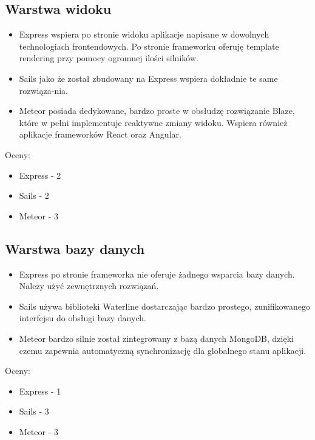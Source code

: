 \documentclass[12pt]{report}
\begin{document}
    \subsection{Warstwa widoku}
      \begin{itemize}
        \item Express wspiera po stronie widoku aplikacje napisane w dowolnych technologiach frontendowych. Po stronie frameworku oferuję template rendering przy pomocy ogromnej ilości silników.
        \item Sails jako że został zbudowany na Express wspiera dokładnie te same rozwiąza-nia.
        \item Meteor posiada dedykowane, bardzo proste w obsłudzę rozwiązanie Blaze, które w pełni implementuje reaktywne zmiany widoku. Wspiera również aplikacje frameworków React oraz Angular.
      \end{itemize}
      Oceny:
      \begin{itemize}
        \item Express - 2
        \item Sails - 2
        \item Meteor - 3
      \end{itemize}
      
    \subsection{Warstwa bazy danych}
      \begin{itemize}
        \item Express po stronie frameworka nie oferuje żadnego wsparcia bazy danych. Należy użyć zewnętrznych rozwiązań.
        \item Sails używa biblioteki Waterline dostarczając bardzo prostego, zunifikowanego interfejsu do obsługi bazy danych.
        \item Meteor bardzo silnie został zintegrowany z bazą danych MongoDB, dzięki czemu zapewnia automatyczną synchronizację dla globalnego stanu aplikacji.
      \end{itemize}
      Oceny:
      \begin{itemize}
        \item Express - 1
        \item Sails - 3
        \item Meteor - 3
      \end{itemize}
      
\end{document}
